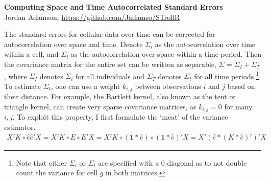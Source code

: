 \RequirePackage{ASetup}


\begin{center}
\textbf{\Large{Computing Space and Time Autocorrelated Standard Errors}}\\
Jordan Adamson, \url{https://github.com/Jadamso/STrollR}
\end{center}
The standard errors for cellular data over time can be corrected for autocorrelation over space and time. Denote $\Sigma_{i}$ as the autocorrelation over time within a cell, and $\Sigma_{t}$ as the autocorrelation over space within a time period. Then the covariance matrix for the entire set can be written as separable,
$\Sigma_{} = \Sigma_{I} + \Sigma_{T}$
, where $\Sigma_{I}$ denotes $\Sigma_{i}$ for all individuals and $\Sigma_{T}$ denotes $\Sigma_{t}$ for all time periods.\footnote{Note that either $\Sigma_{i}$ or $\Sigma_{t}$ are specified with a 0 diagonal as to not double count the variance for cell $g$ in both matrices.} To estimate $\Sigma_{t}$,
one can use a weight $k_{i,j}$ between observations $i$ and $j$ based on their distance. For example, the Bartlett kernel, also known as the tent or triangle kernel, can create very sparse covariance matrices, as $k_{i,j}=0$ for many $i,j$. To exploit this property, I first formulate the `meat' of the variance estimator,
\begin{eqnarray*}
X' K \circ \hat{e} \hat{e}' X
= X' K \circ E \circ E'X 
= X' K \circ (\mathbf{1} * \hat{e}) \circ ( \mathbf{1} * \hat{e})' X
= X' (\hat{e} * (K * \hat{e})' )' X
\end{eqnarray*}


